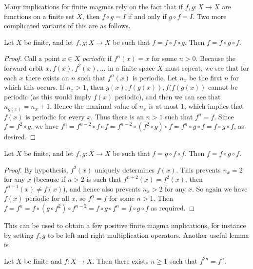 Many implications for finite magmas rely on the fact that if $f, g:X \to X$ are functions on a finite set $X$, then $f \circ g = I$ if and only if $g \circ f = I$.  Two more complicated variants of this are as follows.

\begin{lemma}\label{ffg}  Let $X$ be finite, and let $f, g: X \to X$ be such that $f = f \circ f \circ g$.  Then $f = f \circ g \circ f$.
\end{lemma}

\begin{proof} Call a point $x \in X$ \emph{periodic} if $f^n(x) = x$ for some $n>0$.  Because the forward orbit $x, f(x), f^2(x), \dots$ in a finite space $X$ must repeat, we see that for each $x$ there exists an $n$ such that $f^n(x)$ is periodic.  Let $n_x$ be the first $n$ for which this occurs.  If $n_x > 1$, then $g(x), f(g(x)), f(f(g(x))$ cannot be periodic (as this would imply $f(x)$ periodic), and then we can see that $n_{g(x)} = n_x + 1$.  Hence the maximal value of $n_x$ is at most $1$, which implies that $f(x)$ is periodic for every $x$.  Thus there is an $n > 1$ such that $f^n = f$.  Since $f = f^2 \circ g$, we have $f^n = f^{n-2} \circ f \circ f = f^{n-2} \circ (f^2 \circ g) \circ f = f^n \circ g \circ f = f \circ g \circ f$, as desired.
\end{proof}

\begin{lemma}\label{gff} Let $X$ be finite, and let $f, g: X \to X$ be such that $f = g \circ f \circ f$.  Then $f = f \circ g \circ f$.
\end{lemma}

\begin{proof} By hypothesis, $f^2(x)$ uniquely determines $f(x)$.  This prevents $n_x = 2$ for any $x$ (because if $n>2$ is such that $f^{n+2}(x) = f^2(x)$, then $f^{n+1}(x) \neq f(x)$), and hence also prevents $n_x > 2$ for any $x$.   So again we have $f(x)$ periodic for all $x$, so $f^n = f$ for some $n>1$.  Then $f = f^n = f \circ (g \circ f^2) \circ f^{n-2} = f \circ g \circ f^n = f \circ g \circ f$ as required.
\end{proof}

This can be used to obtain a few positive finite magma implications, for instance by setting $f,g$ to be left and right multiplication operators.  Another useful lemma is

\begin{lemma}\label{period}  Let $X$ be finite and $f: X \to X$.  Then there exists $n \geq 1$ such that $f^{2n} = f^n$.
  \leanok
\end{lemma}

